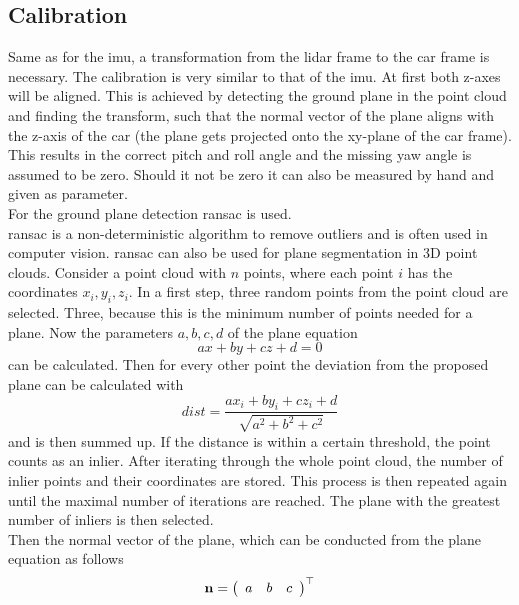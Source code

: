 \subsection{Calibration}
Same as for the \acrshort{imu}, a transformation from the \acrshort{lidar} frame to the car frame is necessary.
The calibration is very similar to that of the \acrshort{imu}.
At first both z-axes will be aligned.
This is achieved by detecting the ground plane in the point cloud and finding the transform, such that the normal vector of the plane aligns with the z-axis of the car (the plane gets projected onto the xy-plane of the car frame).
This results in the correct pitch and roll angle and the missing yaw angle is assumed to be zero.
Should it not be zero it can also be measured by hand and given as parameter.\\
For the ground plane detection \acrfull{ransac} \cite{Fischler1981} is used.\\
\acrshort{ransac} is a non-deterministic algorithm to remove outliers and is often used in computer vision.
\acrshort{ransac} can also be used for plane segmentation in 3D point clouds.
Consider a point cloud with $n$ points, where each point $i$ has the coordinates $x_i, y_i, z_i$.
In a first step, three random points from the point cloud are selected.
Three, because this is the minimum number of points needed for a plane.
Now the parameters $a, b, c, d$ of the plane equation
\begin{equation}
    ax + by + cz + d = 0
\end{equation}
can be calculated.
Then for every other point the deviation from the proposed plane can be calculated with
\begin{equation}
    dist = \frac{ax_i + by_i + cz_i + d}{\sqrt{a^2 + b^2 + c^2}}
\end{equation}
and is then summed up.
If the distance is within a certain threshold, the point counts as an inlier.
After iterating through the whole point cloud, the number of inlier points and their coordinates are stored.
This process is then repeated again until the maximal number of iterations are reached.
The plane with the greatest number of inliers is then selected.\\
Then the normal vector of the plane, which can be conducted from the plane equation as follows
\begin{equation}
    \vb{n} = \left(\begin{array}{lll} a & b & c \end{array}\right)^{\top}
\end{equation}
